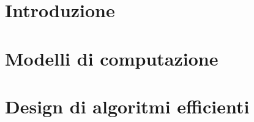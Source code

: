 \documentclass[12pt]{article}
\begin{document}


\tableofcontents
\restoregeometry

\section{Introduzione}


\section{Modelli di computazione}


\section{Design di algoritmi efficienti}

\end{document}
